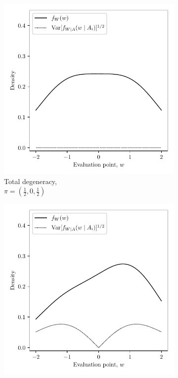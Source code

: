 \begin{figure}[ht]
  \captionsetup[subfigure]{justification=centering}
  \centering
  \begin{subfigure}{0.32\textwidth}
    \centering
    \includegraphics[scale=0.48]{graphics/illustration_total.pdf}
    \caption{
      Total degeneracy, \\
      $\pi = \left( \frac{1}{2}, 0, \frac{1}{2} \right)$
    }
  \end{subfigure}
  \begin{subfigure}{0.32\textwidth}
    \centering
    \includegraphics[scale=0.48]{graphics/illustration_partial.pdf}

\end{subfigure}
\end{figure}
